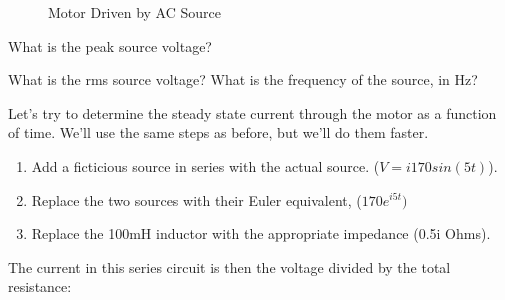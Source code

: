 \par
\begin{figure}[H]
\begin{center}
\caption{Motor Driven by AC Source}
\label{F:8MOTOR}
\end{center}
\end{figure}

\begin{alevel}
What is the peak source voltage?
\end{alevel}

\begin{blevel}
What is the rms source voltage? What is the frequency of the source, in Hz?
\end{blevel}

Let's try to determine the steady state current through the motor as a function of time. We'll use the same steps as before, but we'll do them faster. 
\begin{enumerate}
\item Add a ficticious source in series with the actual source. ($V=i170sin(5t)$).
\item Replace the two sources with their Euler equivalent, ($170e^{i5t})$
\item Replace the 100mH inductor with the appropriate impedance (0.5i Ohms).\par
\end{enumerate}

The current in this series circuit is then the voltage divided by the total resistance:

